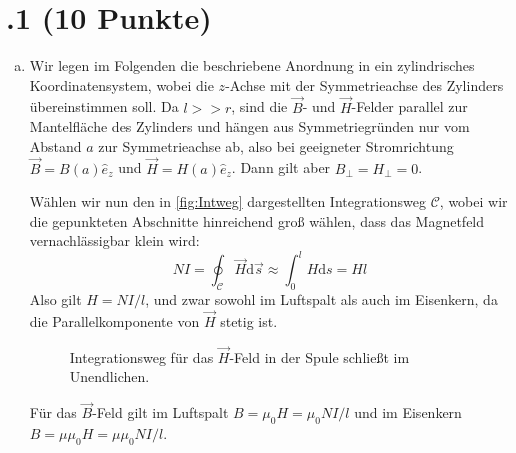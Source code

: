\section*{\nr.1 \titone (10 Punkte)}
\begin{enumerate}[(a)]
\item Wir legen im Folgenden die beschriebene Anordnung in ein zylindrisches Koordinatensystem, wobei die $z$-Achse mit der Symmetrieachse des Zylinders übereinstimmen soll. Da $l>>r$, sind die $\vec{B}$- und $\vec{H}$-Felder parallel zur Mantelfläche des Zylinders und hängen aus Symmetriegründen nur vom Abstand $a$ zur Symmetrieachse ab, also bei geeigneter Stromrichtung $\vec{B}=B(a)\hat{e}_z$ und $\vec{H}=H(a)\hat{e}_z$. Dann gilt aber $B_\perp=H_\perp=0$. 

Wählen wir nun den in \vref{fig:Intweg} dargestellten Integrationsweg $\mathcal{C}$, wobei wir die gepunkteten Abschnitte hinreichend groß wählen, dass das Magnetfeld vernachlässigbar klein wird:
\begin{equation}
NI =\oint_\mathcal{C} \vec{H}\mathrm{d}\vec{s} \approx \int_0^{l}{H \mathrm{d}s} = Hl
\end{equation}
Also gilt $H=NI/l$, und zwar sowohl im Luftspalt als auch im Eisenkern, da die Parallelkomponente von $\vec{H}$ stetig ist.
\begin{figure}[htbp]
\centering
{}
\caption{Integrationsweg für das $\vec{H}$-Feld in der Spule schließt im Unendlichen.}
\label{fig:Intweg}
\end{figure}


Für das $\vec{B}$-Feld gilt im Luftspalt $B=\mu_0 H = \mu_0 N I/l$ und im Eisenkern $B=\mu\mu_0 H = \mu\mu_0 N I /l$.


\end{enumerate}
